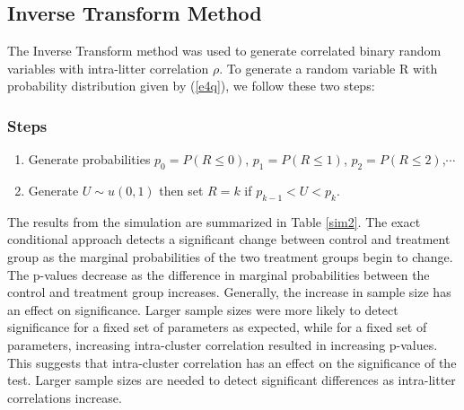 \documentclass[12pt,oneside]{report}
\theoremstyle{definition}
\theoremstyle{mystyle}
\begin{document}
\subsection{Inverse Transform Method}
The Inverse   Transform  method was used  to generate correlated binary random variables with intra-litter correlation   $\rho$. To generate  a random variable R with  probability distribution given by (\ref{e4q}), we follow these two steps: \\
\subsubsection{Steps}
\begin{enumerate}
	\item Generate probabilities $p_{0}=P(R\leq 0)$, $p_{1}=P(R\leq 1)$,  $p_{2}=P(R\leq 2)$,\hspace{5mm}$\cdots$
	
	\item Generate $U\sim u(0,1)$ then set $ R=k$ if $p_{k-1}<U<p_{k}$.
\end{enumerate}

The results from the simulation are summarized in Table \ref{sim2}. The exact conditional approach detects a significant change between control and  	treatment group  as the marginal probabilities of the two treatment groups begin to change. The p-values decrease as the  difference in marginal  probabilities between  the control and treatment group increases. Generally, the increase in sample size  has  an effect on significance. Larger sample sizes were  more likely to detect significance for a fixed set of parameters as expected, while for a fixed set of parameters, increasing intra-cluster correlation resulted in  increasing p-values. This suggests that intra-cluster correlation has an  effect on the significance of the test. Larger sample sizes are needed to detect significant differences as intra-litter correlations increase.

\end{document}
